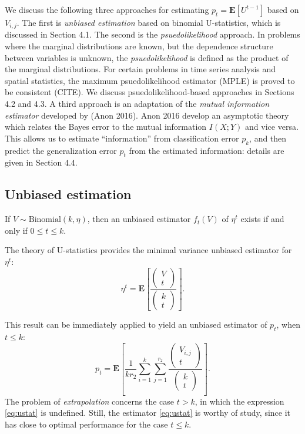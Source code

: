 \documentclass{article}
\newcommand{\E}{\textbf{E}}
\begin{document}
We discuss the following three approaches for estimating $p_t = \E[U^{t-1}]$ based on $V_{i, j}$.
The first is \emph{unbiased estimation} based on binomial U-statistics, which is discussed in Section 4.1.
The second is the \emph{psuedolikelihood} approach.  In problems where the marginal distributions
are known, but the dependence structure between variables is unknown, the \emph{psuedolikelihood} is defined
as the product of the marginal distributions.  For certain problems in time series analysis and
spatial statistics, the maximum psuedolikelihood estimator (MPLE) is proved to be consistent (CITE).
We discuss psuedolikelihood-based approaches in Sections 4.2 and 4.3.
A third approach is an adaptation of the \emph{mutual information estimator} developed by (Anon 2016).
Anon 2016 develop an asymptotic theory which relates the Bayes error to the mutual information $I(X; Y)$
and vice versa.  This allows us to estimate ``information'' from classification error $p_k$, and then predict
the generalization error $p_t$ from the estimated information: details are given in Section 4.4.

\subsection{Unbiased estimation}

If $V \sim \text{Binomial}(k, \eta)$, then an unbiased estimator $f_t(V)$ of $\eta^t$ exists
if and only if $0 \leq t \leq k$.

The theory of U-statistics provides the minimal variance unbiased estimator for $\eta^t$:
\[
\eta^t = \E\left[\frac{\begin{pmatrix}
V \\ t
\end{pmatrix}}{\begin{pmatrix}
k \\ t
\end{pmatrix}}\right].
\]

This result can be immediately applied to yield an unbiased estimator of $p_t$, when $t \leq k$:
\begin{equation}\label{eq:ustat}
p_t = \E\left[ \frac{1}{kr_2}\sum_{i=1}^k\sum_{j=1}^{r_2} \frac{\begin{pmatrix}
V_{i, j} \\ t
\end{pmatrix}}{\begin{pmatrix}
k \\ t
\end{pmatrix}} \right].
\end{equation}
The problem of \emph{extrapolation} concerns the case $t > k$, in which the expression \eqref{eq:ustat} is undefined.
Still, the estimator \eqref{eq:ustat} is worthy of study, since it has close to optimal performance for the case $t \leq k$.
\end{document}
